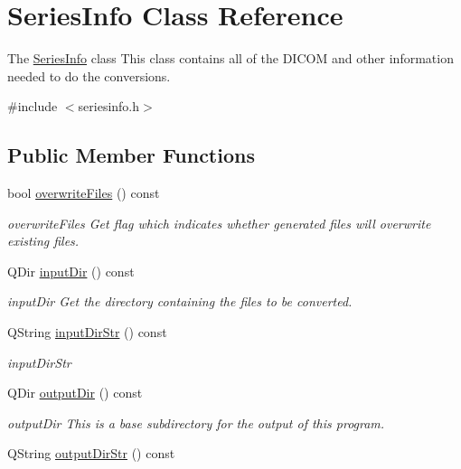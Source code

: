 \hypertarget{class_series_info}{}\section{Series\+Info Class Reference}
\label{class_series_info}


The \hyperlink{class_series_info}{Series\+Info} class This class contains all of the D\+I\+C\+OM and other information needed to do the conversions.  




{\ttfamily \#include $<$seriesinfo.\+h$>$}

\subsection*{Public Member Functions}
\begin{DoxyCompactItemize}
\item 
bool \hyperlink{class_series_info_a21fe1bd18d2f9e2b1f7ceb22e7ad98a3}{overwrite\+Files} () const
\begin{DoxyCompactList}\small\item\em overwrite\+Files Get flag which indicates whether generated files will overwrite existing files. \end{DoxyCompactList}\item 
Q\+Dir \hyperlink{class_series_info_ab30b8c01a3413b913f00203b2ef5a117}{input\+Dir} () const
\begin{DoxyCompactList}\small\item\em input\+Dir Get the directory containing the files to be converted. \end{DoxyCompactList}\item 
Q\+String \hyperlink{class_series_info_a550fbfcf3061fdd50850baa788bf376d}{input\+Dir\+Str} () const
\begin{DoxyCompactList}\small\item\em input\+Dir\+Str \end{DoxyCompactList}\item 
Q\+Dir \hyperlink{class_series_info_af94b9048bc3b60b5d151f227299b394b}{output\+Dir} () const
\begin{DoxyCompactList}\small\item\em output\+Dir This is a base subdirectory for the output of this program. \end{DoxyCompactList}\item 
Q\+String \hyperlink{class_series_info_abc897c5c859293338e45d193ac62c674}{output\+Dir\+Str} () const

\end{DoxyCompactItemize}
